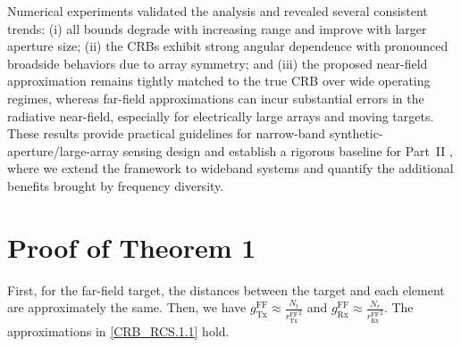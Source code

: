 \documentclass[9pt,final,journal,twocolumn]{IEEEtran}
\begin{document}
Numerical experiments validated the analysis and revealed several consistent trends: (i) all bounds degrade with increasing range and improve with larger aperture size; (ii) the CRBs exhibit strong angular dependence with pronounced broadside behaviors due to array symmetry; and (iii) the proposed near-field approximation remains tightly matched to the true CRB over wide operating regimes, whereas far-field approximations can incur substantial errors in the radiative near-field, especially for electrically large arrays and moving targets. These results provide practical guidelines for narrow-band synthetic-aperture/large-array sensing design and establish a rigorous baseline for Part~II \cite{wei2025PartII}, where we extend the framework to wideband systems and quantify the additional benefits brought by frequency diversity.


 
\appendices
\section{Proof of Theorem 1}
\label{app:proof_thm1}
First, for the far-field target, the distances between the target and each element are approximately the same.  Then, we have $g_{\mathrm {Tx}}^{\mathrm{FF}}\approx \frac{N_t}{{r_{\mathrm{Tx}}^{\mathrm{FF}}}^2}$ and $g_{\mathrm {Rx}}^{\mathrm{FF}}\approx \frac{N_r}{{r_{\mathrm{Rx}}^{\mathrm{FF}}}^2}$.
 The approximations in \eqref{CRB_RCS.1.1} hold. 
\end{document}
